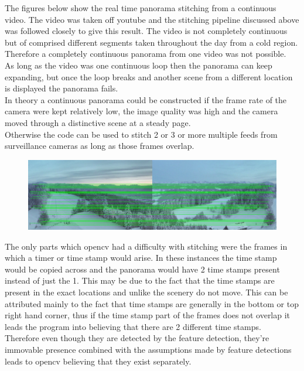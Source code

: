 \documentclass{article}
\begin{document}
The figures below show the real time panorama stitching from a continuous video. The video was taken off youtube and the stitching pipeline discussed above was followed closely to give this result. The video is not completely continuous but of comprised different segments taken throughout the day from a cold region. Therefore a completely continuous panorama from one video was not possible.\\
As long as the video was one continuous loop then the panorama can keep expanding, but once the loop breaks and another scene from a different location is displayed the panorama fails.\\
In theory a continuous panorama could be constructed if the frame rate of the camera were kept relatively low, the image quality was high and the camera moved through a distinctive scene at a steady page.\\
Otherwise the code can be used to stitch 2 or 3 or more multiple feeds from surveillance cameras as long as those frames overlap.

\begin{figure}[H]
	\centering
	\includegraphics[width=14cm]{vpano.png}
	
	
\end{figure}

The only parts which opencv had a difficulty with stitching were the frames in which a timer or time stamp would arise. In these instances the time stamp would be copied across and the panorama would have 2 time stamps present instead of just the 1. This may be due to the fact that the time stamps are present in the exact locations and unlike the scenery do not move.
This can be attributed mainly to the fact that time stamps are generally in the bottom or top right hand corner, thus if the time stamp part of the frames does not overlap it leads the program into believing that there are 2 different time stamps.\\

 Therefore even though they are detected by the feature detection, they're immovable presence combined with the assumptions made by feature detections leads to opencv believing that they exist separately.
\end{document}
